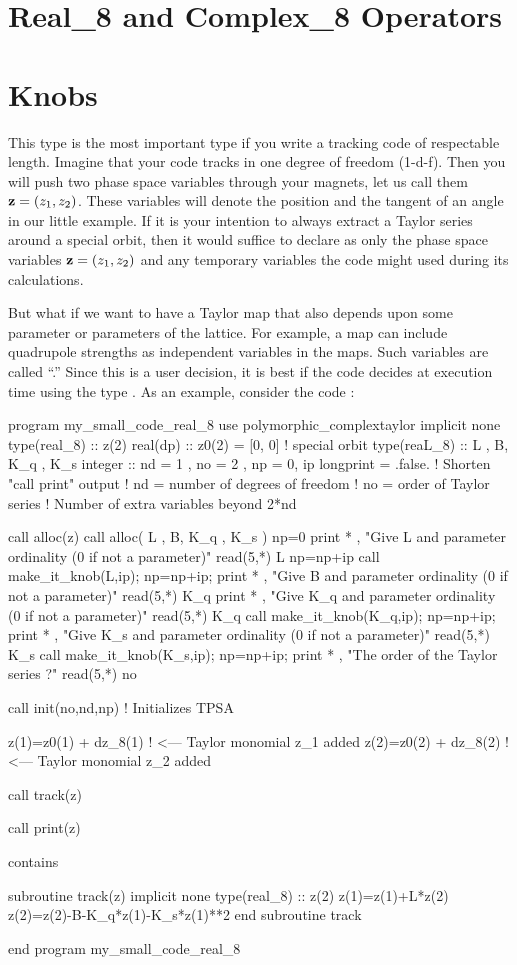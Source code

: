 \documentclass{hitec}     %
\newcommand{\Section}[1]{\section{#1}\vspace*{-1ex}}
\begin{document}
\Section{Real_8 and Complex_8 Operators}
\label{s:real.op}




\Section{Knobs}
\label{sec:real8code}

This type is the most important type if you write a tracking code of respectable length.  Imagine that your code tracks in one degree of freedom (1-d-f). Then you will push two phase space variables through your magnets, let us call them ${\bf z}=(z_1,z_2)$. These variables will denote  the position and the tangent of an angle in our little example.  If it is your  intention to always extract a Taylor series around a special orbit, then  it would suffice to declare as  only the phase space variables ${\bf z}=(z_1,z_2)$ and any temporary variables the code might used during its calculations. 

But what if we want to have a Taylor map that also depends upon some parameter or parameters of the lattice. For example, a map can include quadrupole strengths as independent variables in the maps. Such variables are called ``.'' Since this is a user decision, it is best if the code decides at execution time using the type .
As an example, consider the code :

\begin{code}
program my_small_code_real_8
use polymorphic_complextaylor
implicit none
type(real_8) :: z(2)  
real(dp) :: z0(2) = [0, 0]  ! special orbit
type(reaL_8)  :: L , B, K_q , K_s 
integer :: nd = 1 , no = 2 , np = 0, ip
longprint = .false.         ! Shorten "call print" output
! nd = number of degrees of freedom
! no =  order of Taylor series
! Number of extra variables beyond 2*nd

call alloc(z)
call alloc( L , B, K_q , K_s )
np=0
print * , "Give  L and parameter ordinality (0 if not a parameter)"
read(5,*) L%
np=np+ip
call make_it_knob(L,ip);  np=np+ip;
print * , "Give  B  and parameter ordinality (0 if not a parameter)"
read(5,*) K_q%
print * , "Give  K_q and parameter ordinality (0 if not a parameter)"
read(5,*) K_q%
call make_it_knob(K_q,ip);  np=np+ip;
print * , "Give  K_s and parameter ordinality (0 if not a parameter)"
read(5,*) K_s%
call make_it_knob(K_s,ip); np=np+ip;
print * , "The order of the Taylor series ?"
read(5,*) no

call init(no,nd,np) ! Initializes TPSA 

z(1)=z0(1) + dz_8(1) ! <--- Taylor monomial z_1 added
z(2)=z0(2) + dz_8(2) ! <--- Taylor monomial z_2 added

call track(z)

call print(z)

contains

subroutine track(z)
implicit none
type(real_8) :: z(2) 
 z(1)=z(1)+L*z(2) 
 z(2)=z(2)-B-K_q*z(1)-K_s*z(1)**2 
end subroutine track

end program my_small_code_real_8
\end{code}
\end{document}
